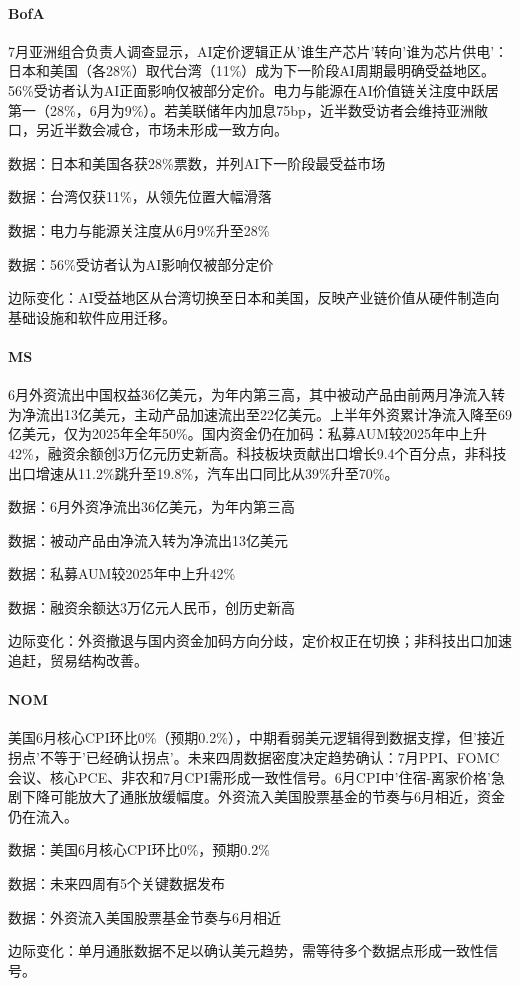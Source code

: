 \documentclass[11pt]{ctexart}
\begin{document}
\paragraph{BofA} 7月亚洲组合负责人调查显示，AI定价逻辑正从'谁生产芯片'转向'谁为芯片供电'：日本和美国（各28\%）取代台湾（11\%）成为下一阶段AI周期最明确受益地区。56\%受访者认为AI正面影响仅被部分定价。电力与能源在AI价值链关注度中跃居第一（28\%，6月为9\%）。若美联储年内加息75bp，近半数受访者会维持亚洲敞口，另近半数会减仓，市场未形成一致方向。
{\small\color{refgray}数据：日本和美国各获28\%票数，并列AI下一阶段最受益市场\par}
{\small\color{refgray}数据：台湾仅获11\%，从领先位置大幅滑落\par}
{\small\color{refgray}数据：电力与能源关注度从6月9\%升至28\%\par}
{\small\color{refgray}数据：56\%受访者认为AI影响仅被部分定价\par}
{\small\color{refgray}边际变化：AI受益地区从台湾切换至日本和美国，反映产业链价值从硬件制造向基础设施和软件应用迁移。\par}
\paragraph{MS} 6月外资流出中国权益36亿美元，为年内第三高，其中被动产品由前两月净流入转为净流出13亿美元，主动产品加速流出至22亿美元。上半年外资累计净流入降至69亿美元，仅为2025年全年50\%。国内资金仍在加码：私募AUM较2025年中上升42\%，融资余额创3万亿元历史新高。科技板块贡献出口增长9.4个百分点，非科技出口增速从11.2\%跳升至19.8\%，汽车出口同比从39\%升至70\%。
{\small\color{refgray}数据：6月外资净流出36亿美元，为年内第三高\par}
{\small\color{refgray}数据：被动产品由净流入转为净流出13亿美元\par}
{\small\color{refgray}数据：私募AUM较2025年中上升42\%\par}
{\small\color{refgray}数据：融资余额达3万亿元人民币，创历史新高\par}
{\small\color{refgray}边际变化：外资撤退与国内资金加码方向分歧，定价权正在切换；非科技出口加速追赶，贸易结构改善。\par}
\paragraph{NOM} 美国6月核心CPI环比0\%（预期0.2\%），中期看弱美元逻辑得到数据支撑，但'接近拐点'不等于'已经确认拐点'。未来四周数据密度决定趋势确认：7月PPI、FOMC会议、核心PCE、非农和7月CPI需形成一致性信号。6月CPI中'住宿-离家价格'急剧下降可能放大了通胀放缓幅度。外资流入美国股票基金的节奏与6月相近，资金仍在流入。
{\small\color{refgray}数据：美国6月核心CPI环比0\%，预期0.2\%\par}
{\small\color{refgray}数据：未来四周有5个关键数据发布\par}
{\small\color{refgray}数据：外资流入美国股票基金节奏与6月相近\par}
{\small\color{refgray}边际变化：单月通胀数据不足以确认美元趋势，需等待多个数据点形成一致性信号。\par}
\end{document}
